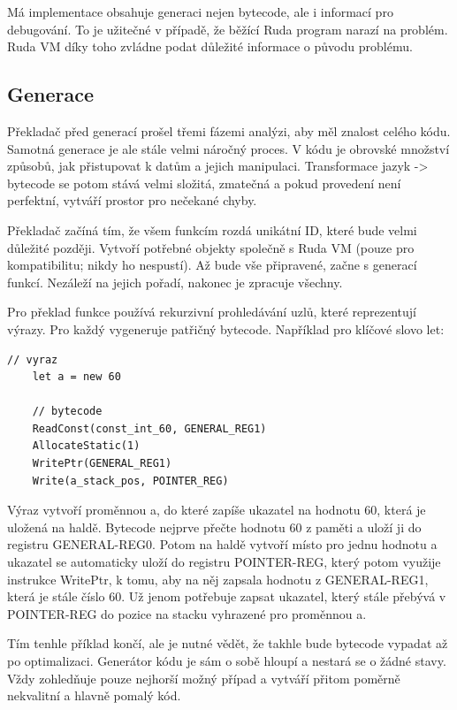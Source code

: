 \documentclass[12pt, a4paper,
twoside,        %
openright
]{report}
\begin{document}
	Má implementace obsahuje generaci nejen bytecode, ale i informací pro debugování. To je užitečné v případě, že běžící Ruda program narazí na problém. Ruda VM díky toho zvládne podat důležité informace o původu problému.
	
	\subsection{Generace}
	
	Překladač před generací prošel třemi fázemi analýzi, aby měl znalost celého kódu. Samotná generace je ale stále velmi náročný proces. V kódu je obrovské množství způsobů, jak přistupovat k datům a jejich manipulaci. Transformace jazyk -> bytecode se potom stává velmi složitá, zmatečná a pokud provedení není perfektní, vytváří prostor pro nečekané chyby.
	
	Překladač začíná tím, že všem funkcím rozdá unikátní ID, které bude velmi důležité později. Vytvoří potřebné objekty společně s Ruda VM (pouze pro kompatibilitu; nikdy ho nespustí). Až bude vše připravené, začne s generací funkcí. Nezáleží na jejich pořadí, nakonec je zpracuje všechny.
	
	Pro překlad funkce používá rekurzivní prohledávání uzlů, které reprezentují výrazy. Pro každý vygeneruje patřičný bytecode. Například pro klíčové slovo let:
	
	\begin{lstlisting}[caption={Překlad klíčového slova let}]
	// vyraz
	let a = new 60
	
	// bytecode
	ReadConst(const_int_60, GENERAL_REG1)
	AllocateStatic(1)     
	WritePtr(GENERAL_REG1)   
	Write(a_stack_pos, POINTER_REG)  
	\end{lstlisting}
	
	Výraz vytvoří proměnnou a, do které zapíše ukazatel na hodnotu 60, která je uložená na haldě. Bytecode nejprve přečte hodnotu 60 z paměti a uloží ji do registru GENERAL-REG0. Potom na haldě vytvoří místo pro jednu hodnotu a ukazatel se automaticky uloží do registru POINTER-REG, který potom využije instrukce WritePtr, k tomu, aby na něj zapsala hodnotu z GENERAL-REG1, která je stále číslo 60. Už jenom potřebuje zapsat ukazatel, který stále přebývá v POINTER-REG do pozice na stacku vyhrazené pro proměnnou a.
	
	Tím tenhle příklad končí, ale je nutné vědět, že takhle bude bytecode vypadat až po optimalizaci. Generátor kódu je sám o sobě hloupí a nestará se o žádné stavy. Vždy zohledňuje pouze nejhorší možný případ a vytváří přitom poměrně nekvalitní a hlavně pomalý kód.
	
\end{document}
